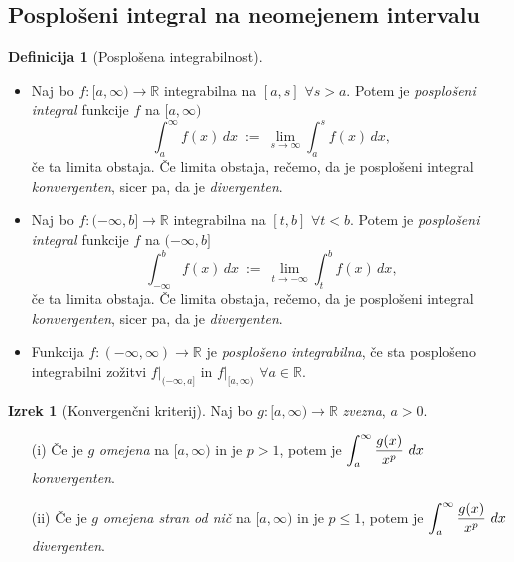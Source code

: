 \documentclass[11pt]{article}
\theoremstyle{definition}
\newtheorem{definicija}{Definicija}[section]
\theoremstyle{definition}
\theoremstyle{definition}
\newtheorem{izrek}{Izrek}[section]
\theoremstyle{theorem}
\begin{document}

\subsection{Posplošeni integral na neomejenem intervalu}
\vspace{0.5cm}

\begin{definicija}[Posplošena integrabilnost]
~
	\begin{itemize}
	
		\item Naj bo $f:[a, \infty) \rightarrow \mathbb{R}$ integrabilna na $[a, s]$ $\forall s > a$. Potem je \textit{\hbox{posplošeni} integral} funkcije $f$ na $[a, \infty)$
		$$\int_{a}^{\infty} f(x)\,dx ~:=~ \lim_{s \rightarrow \infty} \int_{a}^{s} f(x)\,dx,$$
		če ta limita obstaja. Če limita obstaja, rečemo, da je posplošeni \hbox{integral} \textit{konvergenten}, sicer pa, da je \textit{divergenten}. \\
		
		\item Naj bo $f:(-\infty, b] \rightarrow \mathbb{R}$ integrabilna na $[t, b]$ $\forall t < b$. Potem je \textit{posplošeni integral} funkcije $f$ na $(-\infty, b]$
		$$\int_{-\infty}^{b} f(x)\,dx ~:=~ \lim_{t \rightarrow -\infty} \int_{t}^{b} f(x)\,dx,$$
		če ta limita obstaja. Če limita obstaja, rečemo, da je posplošeni \hbox{integral} \textit{konvergenten}, sicer pa, da je \textit{divergenten}. \\
		
		\item Funkcija $f:(-\infty, \infty) \rightarrow \mathbb{R}$ je \textit{posplošeno integrabilna}, če sta \hbox{posplošeno} integrabilni zožitvi $f |_{(-\infty, a]}$ in $f |_{[a, \infty)}$ $\forall a \in \mathbb{R}$. 
		
	\end{itemize}
\end{definicija}
\vspace{0.5cm}

\begin{izrek}[Konvergenčni kriterij]

Naj bo $g:[a, \infty) \rightarrow \mathbb{R}$ \textit{zvezna}, $a > 0$.
\begin{enumerate}

	\item[(i)] Če je $g$ \textit{omejena} na $[a, \infty)$ in je $p>1$, potem je $\mathlarger{\int_a^{\infty} \frac{g(x)}{x^p}~dx}$ \hbox{\textit{konvergenten}}.
	
	\item[(ii)] Če je $g$ \textit{omejena stran od nič} na $[a, \infty)$ in je $p \leq 1$, potem je $\mathlarger{\int_a^{\infty} \frac{g(x)}{x^p}~dx}$ \textit{divergenten}.

\end{enumerate}

\end{izrek}
\vspace{0.5cm}
\end{document}
